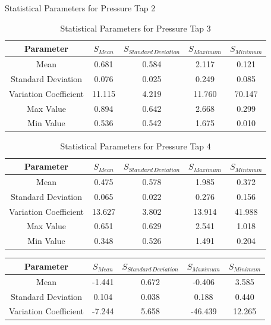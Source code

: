 \documentclass[11pt,a4paper,titlepage]{report}
\begin{document}
\begin{appendix}
\begin{table}[h]
    \caption{Statistical Parameters for Pressure Tap 2}
    \label{tab:wind statistical parameters 2}
\end{table}
\begin{table}[h]
    \centering
    \begin{tabular}{c|c|c|c|c}
   Parameter  & $S_{Mean}$ & $S_{Standard\,Deviation}$ & $S_{Maximum}$ &	$S_{Minimum}$ \\
    \hline
  Mean                  & 0.681  & 0.584 & 2.117  & 0.121  \\
Standard Deviation    & 0.076  & 0.025 & 0.249  & 0.085  \\
Variation Coefficient & 11.115 & 4.219 & 11.760 & 70.147 \\
Max Value             & 0.894  & 0.642 & 2.668  & 0.299  \\
Min Value             & 0.536  & 0.542 & 1.675  & 0.010 
    \end{tabular}
    \caption{Statistical Parameters for Pressure Tap 3}
    \label{tab:wind statistical parameters 3}
\end{table}
\begin{table}[h]
    \centering
    \begin{tabular}{c|c|c|c|c}
   Parameter  & $S_{Mean}$ & $S_{Standard\,Deviation}$ & $S_{Maximum}$ &	$S_{Minimum}$ \\
    \hline
  Mean                  & 0.475  & 0.578 & 1.985  & 0.372  \\
Standard Deviation    & 0.065  & 0.022 & 0.276  & 0.156  \\
Variation Coefficient & 13.627 & 3.802 & 13.914 & 41.988 \\
Max Value             & 0.651  & 0.629 & 2.541  & 1.018  \\
Min Value             & 0.348  & 0.526 & 1.491  & 0.204 
    \end{tabular}
    \caption{Statistical Parameters for Pressure Tap 4}
    \label{tab:wind statistical parameters 4}
\end{table}
\begin{table}[h]
    \centering
    \begin{tabular}{c|c|c|c|c}
   Parameter  & $S_{Mean}$ & $S_{Standard\,Deviation}$ & $S_{Maximum}$ &	$S_{Minimum}$ \\
    \hline
Mean                  & -1.441 & 0.672 & -0.406  & 3.585  \\
Standard Deviation    & 0.104  & 0.038 & 0.188   & 0.440  \\
Variation Coefficient & -7.244 & 5.658 & -46.439 & 12.265 \\

\end{tabular}
\end{table}
\end{appendix}
\end{document}
